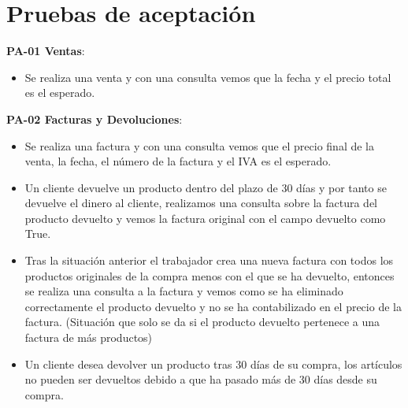 



\section{Pruebas de aceptación}

\textbf{PA-01 Ventas}:
\begin{itemize}
	\item Se realiza una venta y con una consulta vemos que la fecha y el precio total es el esperado.
\end{itemize}

\textbf{PA-02 Facturas y Devoluciones}:
\begin{itemize}
	\item Se realiza una factura y con una consulta vemos que el precio final de la venta, la fecha, el número de la factura y el IVA es el esperado.
	\item Un cliente devuelve un producto dentro del plazo de 30 días y por tanto se devuelve el dinero al cliente, realizamos una consulta sobre la factura del producto devuelto y vemos la factura original con el campo devuelto como True.
	\item Tras la situación anterior el trabajador crea una nueva factura con todos los productos originales de la compra menos con el que se ha devuelto, entonces se realiza una consulta a la factura y vemos como se ha eliminado correctamente el producto devuelto y no se ha contabilizado en el precio de la factura. (Situación que solo se da si el producto devuelto pertenece a una factura de más productos)
	\item Un cliente desea devolver un producto tras 30 días de su compra, los artículos no pueden ser devueltos debido a que ha pasado más de 30 días desde su compra.
\end{itemize}

